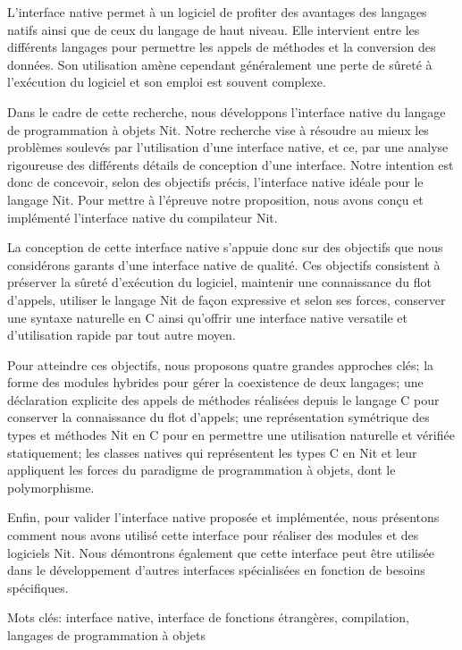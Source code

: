 {\abstract




L'interface native permet à un logiciel de profiter des avantages des langages natifs ainsi que de ceux du langage de haut niveau. Elle intervient entre les différents langages pour permettre les appels de méthodes et la conversion des données. Son utilisation amène cependant généralement une perte de sûreté à l'exécution du logiciel et son emploi est souvent complexe. 


Dans le cadre de cette recherche, nous développons l'interface native du langage de programmation à objets Nit. Notre recherche vise à résoudre au mieux les problèmes soulevés par l'utilisation d'une interface native, et ce, par une analyse rigoureuse des différents détails de conception d'une interface. Notre intention est donc de concevoir, selon des objectifs précis, l'interface native idéale pour le langage Nit. Pour mettre à l'épreuve notre proposition, nous avons conçu et implémenté l'interface native du compilateur Nit.

La conception de cette interface native s'appuie donc sur des objectifs que nous considérons garants d'une interface native de qualité. Ces objectifs consistent à préserver la sûreté d'exécution du logiciel, maintenir une connaissance du flot d'appels, utiliser le langage Nit de façon expressive et selon ses forces, conserver une syntaxe naturelle en C ainsi qu'offrir une interface native versatile et d'utilisation rapide par tout autre moyen.

Pour atteindre ces objectifs, nous proposons quatre grandes approches clés; la forme des modules hybrides pour gérer la coexistence de deux langages; une déclaration explicite des appels de méthodes réalisées depuis le langage C pour conserver la connaissance du flot d'appels; une représentation symétrique des types et méthodes Nit en C pour en permettre une utilisation naturelle et vérifiée statiquement; les classes natives qui représentent les types C en Nit et leur appliquent les forces du paradigme de programmation à objets, dont le polymorphisme.

Enfin, pour valider l'interface native proposée et implémentée, nous présentons comment nous avons utilisé cette interface pour réaliser des modules et des logiciels Nit. Nous démontrons également que cette interface peut être utilisée dans le développement d'autres interfaces spécialisées en fonction de besoins spécifiques.

Mots clés: interface native, interface de fonctions étrangères, compilation, langages de programmation à objets
}

